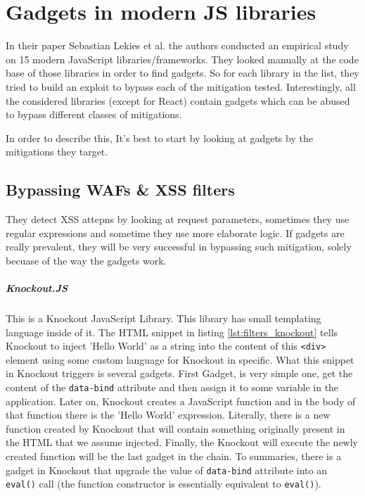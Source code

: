 \chapter{Gadgets in modern JS libraries}
In their paper  Sebastian Lekies et al. \cite{paper} the authors conducted an empirical study on 15 modern JavaScript libraries/frameworks. They looked manually at the code base of those libraries in order to find gadgets. So for each library in the list, they tried to build an exploit to bypass each of the mitigation tested. Interestingly, all the considered libraries (except for React) contain gadgets which can be abused to bypass different classes of mitigations. 

In order to describe this, It's best to start by looking at gadgets by the mitigations they target. 

\section{Bypassing WAFs \& XSS filters}
They detect XSS attepns by looking at request parameters, sometimes they use regular expressions and sometime they use more elaborate logic. If gadgets are really prevalent, they will be very successful in bypassing such mitigation, solely becuase of the way the gadgets work.  

\paragraph{Knockout.JS}
This is a Knockout JavaScript Library. This library has small templating language inside of it. The HTML snippet in listing \ref{lst:filters_knockout} tells Knockout to inject 'Hello World' as a string into the content of this \verb|<div>| element using some custom language for Knockout in specific. What this snippet in Knockout triggers is several gadgets. First Gadget, is very simple one, get the content of the \verb|data-bind| attribute and then assign it to some variable in the application. Later on, Knockout creates a JavaScript function and in the body of that function there is the 'Hello World' expression. Literally, there is a new function created by Knockout that will contain something originally present in the HTML that we assume injected. Finally, the Knockout will execute the newly created function will be the last gadget in the chain. To summaries, there is a gadget in Knockout that upgrade the value of \verb|data-bind| attribute into an \verb|eval()| call (the function constructor is essentially equivalent to \verb|eval()|).\\


